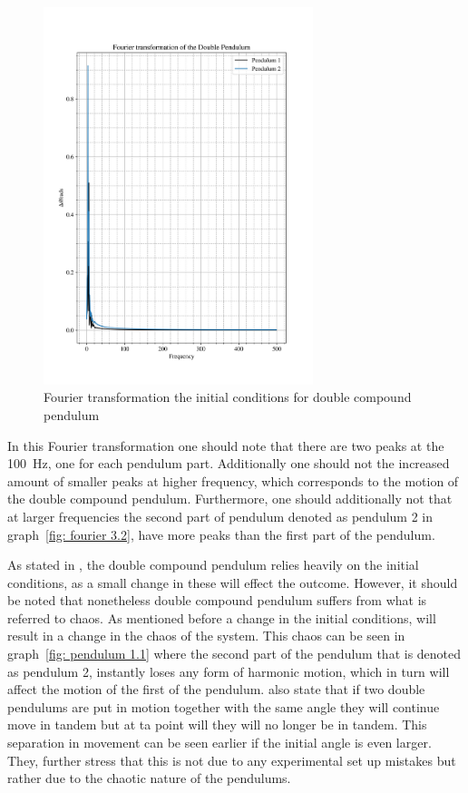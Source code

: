 \documentclass[12pt, a4paper]{article}
\begin{document}
\begin{figure}[H]
    \centering
    \includegraphics[width = 0.7\textwidth]{plots/Plot 3.2.png}\caption{Fourier transformation the initial conditions for double compound pendulum}\label{fig: fourier 2.2}
\end{figure}

In this Fourier transformation one should note that there are two peaks at the \qty{100}{\hertz}, one for each pendulum part. Additionally one should not the increased amount of smaller peaks at higher frequency, which corresponds to the motion of the double compound pendulum. Furthermore, one should additionally not that at larger frequencies the second part of pendulum denoted as pendulum 2 in graph~\ref{fig: fourier 3.2}, have more peaks than the first part of the pendulum. 

As stated in \cite{chaos}, the double compound pendulum relies heavily on the initial conditions, as a small change in these will effect the outcome. However, it should be noted that nonetheless double compound pendulum suffers from what is referred to chaos. As mentioned before a change in the initial conditions, will result in a change in the chaos of the system. This chaos can be seen in graph~\ref{fig: pendulum 1.1} where the second part of the pendulum that is denoted as pendulum 2, instantly loses any form of harmonic motion, which in turn will affect the motion of the first of the pendulum. \cite{chaos} also state that if two double pendulums are put in motion together with the same angle they will continue move in tandem but at ta point will they will no longer be in tandem. This separation in movement can be seen earlier if the initial angle is even larger. They, further stress that this is not due to any experimental set up mistakes but rather due to the chaotic nature of the pendulums.
\end{document}
